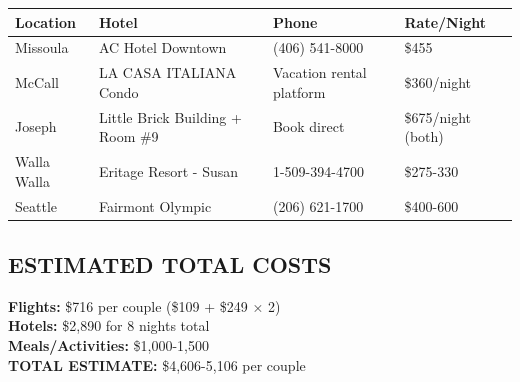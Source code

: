 \documentclass[
  10pt,
]{article}
\begin{document}
\begin{longtable}[]{@{}
  >{\raggedright\arraybackslash}p{}
  >{\raggedright\arraybackslash}p{}
  >{\raggedright\arraybackslash}p{}
  >{\raggedright\arraybackslash}p{}@{}}
\toprule\noalign{}
\begin{minipage}[b]{\linewidth}\raggedright
\textcolor{secondary}{Location}
\end{minipage} & \begin{minipage}[b]{\linewidth}\raggedright
\textcolor{secondary}{Hotel}
\end{minipage} & \begin{minipage}[b]{\linewidth}\raggedright
\textcolor{secondary}{Phone}
\end{minipage} & \begin{minipage}[b]{\linewidth}\raggedright
\textcolor{secondary}{Rate/Night}
\end{minipage} \\
\midrule\noalign{}
\endhead
\bottomrule\noalign{}
\endlastfoot
\textcolor{primary}{Missoula} & AC Hotel Downtown & (406) 541-8000 &
\$455 \\
\textcolor{primary}{McCall} & LA CASA ITALIANA Condo & Vacation rental
platform & \$360/night \\
\textcolor{primary}{Joseph} & Little Brick Building + Room \#9 & Book
direct & \$675/night (both) \\
\textcolor{primary}{Walla Walla} & Eritage Resort - Susan &
\textcolor{primary}{1-509-394-4700} & \$275-330 \\
\textcolor{primary}{Seattle} & Fairmont Olympic & (206) 621-1700 &
\$400-600 \\
\end{longtable}

\subsection{\texorpdfstring{\textcolor{secondary}{ESTIMATED TOTAL COSTS}}{}}\label{section-57}

\textbf{\textcolor{primary}{Flights:}} \$716 per couple (\$109 + \$249 ×
2)\\
\textbf{\textcolor{primary}{Hotels:}} \$2,890 for 8 nights total\\
\textbf{\textcolor{primary}{Meals/Activities:}} \$1,000-1,500\\
\textbf{\textcolor{primary}{TOTAL ESTIMATE:}} \$4,606-5,106 per couple
\end{document}
